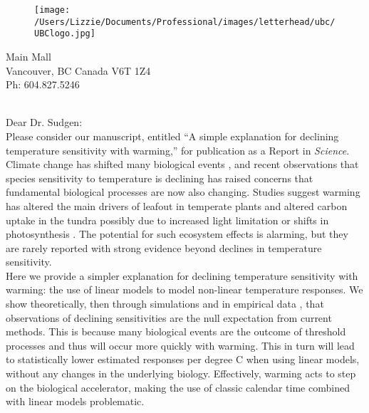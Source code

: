 \documentclass[11pt,a4paper]{article}
\begin{document}

\begin{figure}[htbp]
\hspace*{14cm}                                                           
\texttt{[image: /Users/Lizzie/Documents/Professional/images/letterhead/ubc/UBClogo.jpg]}
\end{figure}
\vspace{-10ex}
\begin{small}
 Main Mall \\
\noindent Vancouver, BC Canada V6T 1Z4\\
\noindent Ph: 604.827.5246\\
\end{small}
\vspace{2ex}\\
\noindent Dear Dr. Sudgen:
\vspace{1.5ex}\\
Please consider our manuscript, entitled ``A simple explanation for declining temperature sensitivity with warming,'' for publication as a Report in \emph{Science}. 
\vspace{1.5ex}\\
Climate change has shifted many biological events \citep{IPCC:2014sm}, and recent observations that species sensitivity to temperature is declining has raised concerns that fundamental biological processes are now also changing. Studies suggest warming has altered the main drivers of leafout in temperate plants \citep{fu2015,gusewell2017,Samplonius:2018aa,vitasse2018} and altered carbon uptake in the tundra possibly due to increased light limitation or shifts in photosynthesis \citep{piao2017,Zhu2019}. The potential for such ecosystem effects is alarming, but they are rarely reported with strong evidence beyond declines in temperature sensitivity.
\vspace{1.5ex}\\
Here we provide a simpler explanation for declining temperature sensitivity with warming: the use of linear models to model non-linear temperature responses. We show theoretically, then through simulations and in empirical data \citep[using the same dataset used in][]{fu2015}, that observations of declining sensitivities are the null expectation from current methods. This is because many biological events are the outcome of threshold processes and thus will occur more quickly with warming. This in turn will lead to statistically lower estimated responses per degree C when using linear models, without any changes in the underlying biology. Effectively, warming acts to step on the biological accelerator, making the use of classic calendar time combined with linear models problematic. 
\end{document}
